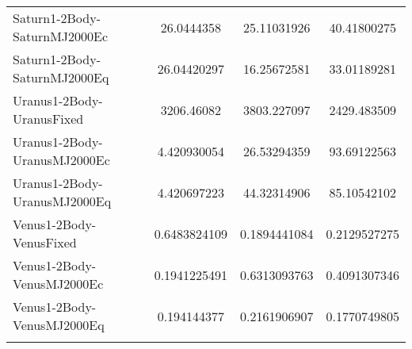 \begin{table}[htbp!]
\begin{tabular}{lccc}
         Saturn1-2Body-SaturnMJ2000Ec & 26.0444358 & 25.11031926 & 40.41800275 \\
         Saturn1-2Body-SaturnMJ2000Eq & 26.04420297 & 16.25672581 & 33.01189281 \\
         Uranus1-2Body-UranusFixed & 3206.46082 & 3803.227097 & 2429.483509 \\
         Uranus1-2Body-UranusMJ2000Ec & 4.420930054 & 26.53294359 & 93.69122563 \\
         Uranus1-2Body-UranusMJ2000Eq & 4.420697223 & 44.32314906 & 85.10542102 \\
         Venus1-2Body-VenusFixed & 0.6483824109 & 0.1894441084 & 0.2129527275 \\
         Venus1-2Body-VenusMJ2000Ec & 0.1941225491 & 0.6313093763 & 0.4091307346 \\
         Venus1-2Body-VenusMJ2000Eq & 0.194144377 & 0.2161906907 & 0.1770749805 \\
      \hline\hline
      \label{Table: MacGMAT-STK CS Parameters Set 3} 
\end{tabular}
\end{table}
